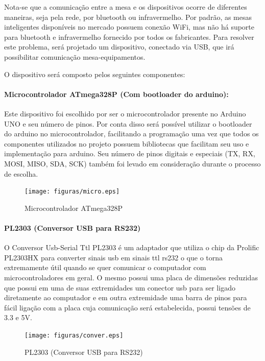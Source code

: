Nota-se que a comunicação entre a mesa e os dispositivos ocorre de diferentes
maneiras, seja pela rede, por bluetooth ou infravermelho. Por padrão, as mesas
inteligentes disponíveis no mercado possuem conexão WiFi, mas não há suporte
para bluetooth e infravermelho fornecido por todos os fabricantes. Para resolver
este problema, será projetado um dispositivo, conectado via USB, que irá
possibilitar comunicação mesa-equipamentos.

O dispositivo será composto pelos seguintes componentes:

  \paragraph{Microcontrolador ATmega328P (Com bootloader do arduino):}
  Este dispositivo foi escolhido por ser o microcontrolador presente no Arduino UNO e
  seu número de pinos. Por conta disso será possível utilizar o bootloader do
  arduino no microcontrolador, facilitando a programação uma vez que todos os
  componentes utilizados no projeto possuem bibliotecas que facilitam seu uso e
  implementação para arduino. Seu número de pinos digitais e especiais (TX, RX,
  MOSI, MISO, SDA, SCK) também foi levado em consideração durante o processo de
  escolha.

  \begin{figure}[!h]
    \centering
    \texttt{[image: figuras/micro.eps]}
    \caption{Microcontrolador ATmega328P\label{fig:micro}}
  \end{figure}

  \paragraph{PL2303 (Conversor USB para RS232)}
  O Conversor Usb-Serial Ttl
  PL2303 é um adaptador que utiliza o chip da Prolific PL2303HX para converter
  sinais usb em sinais ttl rs232 o que o torna extremamente útil quando se quer
  comunicar o computador com microcontroladores em geral. O mesmo possui uma
  placa de dimensões reduzidas que possui em uma de suas extremidades um
  conector usb para ser ligado diretamente ao computador e em outra extremidade
  uma barra de pinos para fácil ligação com a placa cuja comunicação será
  estabelecida, possui tensões de 3.3 e 5V.

  \begin{figure}[!h]
    \centering
    \texttt{[image: figuras/conver.eps]}
    \caption{PL2303 (Conversor USB para RS232)\label{fig:conver}}
  \end{figure}

